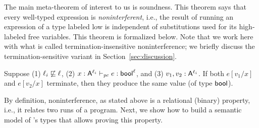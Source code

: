 
The main meta-theorem of interest to us is soundness. This theorem
says that every well-typed expression is \emph{noninterferent}, i.e.,
the result of running an expression of a type labeled low is
independent of substitutions used for its high-labeled free
variables. This theorem is formalized below. Note that we work here
with what is called termination-insensitive noninterference; we
briefly discuss the termination-sensitive variant in
Section~\ref{sec:discussion}.
\begin{thm}
    \label{thm:ni-fg}
  Suppose (1) $\ell_i \not\sqsubseteq \ell$, (2)
  $x : \mathsf{A}^{\ell_i} \vdash_{\mathit{pc}} e: \mathsf{bool}^\ell$, and (3)
  $ v_1, v_2: \smash{\smash{\mathsf{A}}^{\smash{\ell}_i}}$. If both $e[v_1/x]$ and $e[v_2/x]$
  terminate, then they produce the same value (of type $\mathsf{bool}$).
\end{thm}

By definition, noninterference, as stated above is a relational
(binary) property, i.e., it relates two runs of a program. Next, we
show how to build a semantic model of {\fg}'s types that allows
proving this property.

